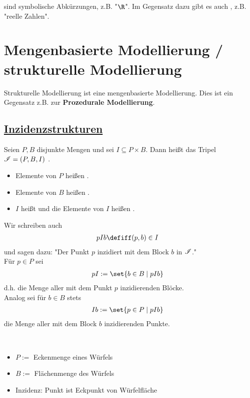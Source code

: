  sind symbolische Abkürzungen, z.B. "$\R$".
Im Gegensatz dazu gibt es auch , z.B. "reelle Zahlen".

\section{Mengenbasierte Modellierung / strukturelle Modellierung}

Strukturelle Modellierung ist eine mengenbasierte Modellierung.
Dies ist ein Gegensatz z.B. zur \textbf{Prozedurale Modellierung}.

\subsection{\href{https://de.wikipedia.org/wiki/Inzidenzstruktur}{Inzidenzstrukturen}}
\begin{definition}
	Seien $P,B$ disjunkte Mengen und sei $I\subseteq P\times B$.
	Dann heißt das Tripel $\mathscr{I}=(P,B,I)$ .
	\begin{itemize}
		\item Elemente von $P$ heißen .
		\item Elemente von $B$ heißen .
		\item $I$ heißt  und die Elemente von $I$ heißen .
	\end{itemize}
	Wir schreiben auch
	\begin{align*}
		pIb\defiff (p,b)\in I
	\end{align*}
	und sagen dazu:
	"Der Punkt $p$ inzidiert mit dem Block $b$ in $\mathscr{I}$."\\
	Für $p\in P$ sei
	\begin{align*}
		pI:=\set{b\in B\mid pIb}
	\end{align*}
	d.h. die Menge aller mit dem Punkt $p$ inzidierenden Blöcke.\\
	Analog sei für $b\in B$ stets
	\begin{align*}
		Ib:=\set{p\in P\mid pIb}
	\end{align*}
	die Menge aller mit dem Block $b$ inzidierenden Punkte.
\end{definition}

\begin{beispiel}\
	\begin{itemize}
		\item $P:=$ Eckenmenge eines Würfels
		\item $B:=$ Flächenmenge des Würfels
		\item Inzidenz: Punkt ist Eckpunkt von Würfelfläche
	\end{itemize}
\end{beispiel}

